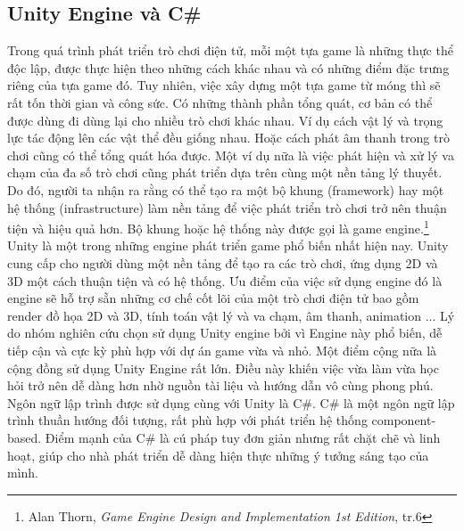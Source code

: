 \subsection{Unity Engine và C\#}
\hspace*{.5cm}Trong quá trình phát triển trò chơi điện tử, mỗi một tựa game là những thực thể độc lập, được thực hiện theo những cách khác nhau và có những điểm đặc trưng riêng của tựa game đó. Tuy nhiên, việc xây dựng một tựa game từ móng thì sẽ rất tốn thời gian và công sức. Có những thành phần tổng quát, cơ bản có thể được dùng đi dùng lại cho nhiều trò chơi khác nhau. Ví dụ cách vật lý và trọng lực tác động lên các vật thể đều giống nhau. Hoặc cách phát âm thanh trong trò chơi cũng có thể tổng quát hóa được. Một ví dụ nữa là việc phát hiện và xử lý va chạm của đa số trò chơi cũng phát triển dựa trên cùng một nền tảng lý thuyết. Do đó, người ta nhận ra rằng có thể tạo ra một bộ khung (framework) hay một hệ thống (infrastructure) làm nền tảng để việc phát triển trò chơi trở nên thuận tiện và hiệu quả hơn. Bộ khung hoặc hệ thống này được gọi là game engine.\footnote{Alan Thorn, \textit{Game Engine Design and Implementation 1st Edition}, tr.6}\\

Unity là một trong những engine phát triển game phổ biến nhất hiện nay. Unity cung cấp cho người dùng một nền tảng để tạo ra các trò chơi, ứng dụng 2D và 3D một cách thuận tiện và có hệ thống. Ưu điểm của việc sử dụng engine đó là engine sẽ hỗ trợ sẵn những cơ chế cốt lõi của một trò chơi điện tử bao gồm render đồ họa 2D và 3D, tính toán vật lý và va chạm, âm thanh, animation ... Lý do nhóm nghiên cứu chọn sử dụng Unity engine bởi vì Engine này phổ biến, dễ tiếp cận và cực kỳ phù hợp với dự án game vừa và nhỏ. Một điểm cộng nữa là cộng đồng sử dụng Unity Engine rất lớn. Điều này khiến việc vừa làm vừa học hỏi trở nên dễ dàng hơn nhờ nguồn tài liệu và hướng dẫn vô cùng phong phú.\\

Ngôn ngữ lập trình được sử dụng cùng với Unity là C\#. C\# là một ngôn ngữ lập trình thuần hướng đối tượng, rất phù hợp với phát triển hệ thống component-based. Điểm mạnh của C\# là cú pháp tuy đơn giản nhưng rất chặt chẽ và linh hoạt, giúp cho nhà phát triển dễ dàng hiện thực những ý tưởng sáng tạo của mình.\\